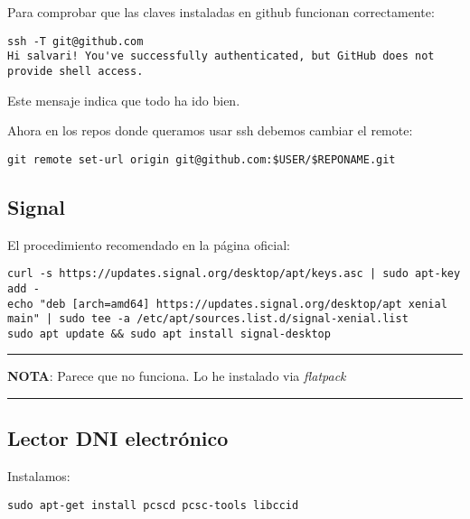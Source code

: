 \documentclass[
  12pt,
  spanish,
]{article}
\begin{document}
Para comprobar que las claves instaladas en github funcionan
correctamente:

\begin{verbatim}
ssh -T git@github.com
Hi salvari! You've successfully authenticated, but GitHub does not provide shell access.
\end{verbatim}

Este mensaje indica que todo ha ido bien.

Ahora en los repos donde queramos usar ssh debemos cambiar el remote:

\begin{verbatim}
git remote set-url origin git@github.com:$USER/$REPONAME.git
\end{verbatim}

\hypertarget{signal}{%
\subsection{Signal}\label{signal}}

El procedimiento recomendado en la página oficial:

\begin{verbatim}
curl -s https://updates.signal.org/desktop/apt/keys.asc | sudo apt-key add -
echo "deb [arch=amd64] https://updates.signal.org/desktop/apt xenial main" | sudo tee -a /etc/apt/sources.list.d/signal-xenial.list
sudo apt update && sudo apt install signal-desktop
\end{verbatim}

\begin{center}\rule{0.5\linewidth}{\linethickness}\end{center}

\textbf{NOTA}: Parece que no funciona. Lo he instalado via
\emph{flatpack}

\begin{center}\rule{0.5\linewidth}{\linethickness}\end{center}

\hypertarget{lector-dni-electruxf3nico}{%
\subsection{Lector DNI electrónico}\label{lector-dni-electruxf3nico}}

Instalamos:

\begin{verbatim}
sudo apt-get install pcscd pcsc-tools libccid
\end{verbatim}
\end{document}
